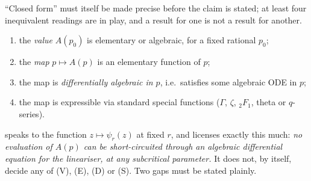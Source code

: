\documentclass[11pt,a4paper]{article}
\theoremstyle{plain}
\theoremstyle{definition}
\begin{document}
``Closed form'' must itself be made precise before the claim is stated; at least four inequivalent readings are in play, and a result for one is not a result for another.
\begin{enumerate}[label=\textup{(\Alph*)},leftmargin=*]
\item[\textbf{(V)}] the \emph{value} $A(p_0)$ is elementary or algebraic, for a fixed rational $p_0$;
\item[\textbf{(E)}] the \emph{map} $p\mapsto A(p)$ is an elementary function of $p$;
\item[\textbf{(D)}] the map is \emph{differentially algebraic in $p$}, i.e.\ satisfies some algebraic ODE in $p$;
\item[\textbf{(S)}] the map is expressible via standard special functions ($\Gamma$, $\zeta$, ${}_2F_1$, theta or $q$-series).
\end{enumerate}
 speaks to the function $z\mapsto\psi_r(z)$ at fixed $r$, and licenses exactly this much: \emph{no evaluation of $A(p)$ can be short-circuited through an algebraic differential equation for the lineariser, at any subcritical parameter.} It does not, by itself, decide any of (V), (E), (D) or (S). Two gaps must be stated plainly.
\end{document}
